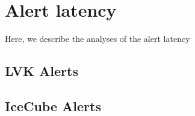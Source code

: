 \section{Alert latency}\label{sec:latency}

Here, we describe the analyses of the alert latency

\subsection{LVK Alerts}\label{subsec:latency-LVK}

\subsection{IceCube Alerts}\label{subsec:latency-IceCube}


\newpage